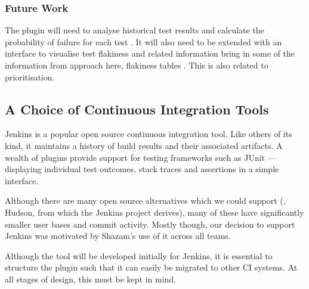 \subsubsection{Future Work}

The plugin will need to analyse historical test results and calculate the probability of failure for each test . It will also need to be extended with an interface to visualise test flakiness and related information {\todo bring in some of the information from approach here, flakiness tables \etc}. This is also related to prioritisation.


\subsection{A Choice of Continuous Integration Tools}

Jenkins \cite{Jenkins} is a popular open source continuous integration tool. Like others of its kind, it maintains a history of build results and their associated artifacts. A wealth of plugins provide support for testing frameworks such as JUnit --- displaying individual test outcomes, stack traces and assertions in a simple interface.

Although there are many open source alternatives which we could support (\eg, Hudson, from which the Jenkins project derives), many of these have significantly smaller user bases and commit activity. Mostly though, our decision to support Jenkins was motivated by Shazam's use of it across all teams.

Although the tool will be developed initially for Jenkins, it is essential to structure the plugin such that it can easily be migrated to other CI systems. At all stages of design, this must be kept in mind.